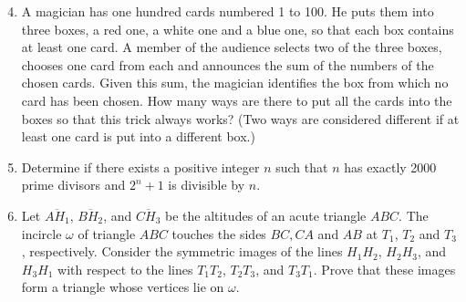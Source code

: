 \documentclass[12pt]{article}
\begin{document}
\vspace*{.3in}

\begin{enumerate}
\setcounter{enumi}{3}
\item %
A magician has one hundred cards numbered 1 to 100. He puts them into three
boxes, a red one, a white one and a blue one, so that each box contains
at least one card. A member of the audience selects two of the three boxes,
chooses one card from each and announces the sum of the numbers of the chosen
cards. Given this sum, the magician identifies the box from which no card has
been chosen. How many ways are there to put all the cards into the boxes so
that this trick always works? (Two ways are considered different if at least
one card is put into a different box.)

\item %
Determine if there exists a positive integer $n$ such that $n$ has exactly
2000 prime divisors and $2^n+1$ is divisible by $n$.

\item %
Let $\overline{AH_1}$, $\overline{BH_2}$, and $\overline{CH_3}$ be the
altitudes of an acute triangle $ABC$. The incircle $\omega$ of triangle
$ABC$ touches the sides $BC, CA$ and $AB$ at $T_1$, $T_2$ and $T_3$,
respectively. Consider the symmetric images of the lines $H_1H_2$,
$H_2H_3$, and $H_3H_1$ with respect to the lines $T_1T_2$, $T_2T_3$,
and $T_3T_1$. Prove that these images form a triangle whose vertices
lie on $\omega$.
\end{enumerate}
\end{document}
